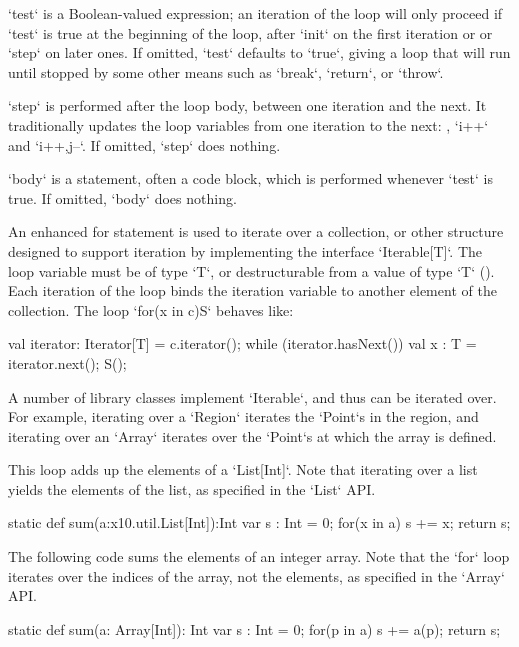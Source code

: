 \xcd`test` is a Boolean-valued expression; an iteration of the loop will only
proceed if \xcd`test` is true at the beginning of the loop, after \xcd`init`
on the first iteration or or \xcd`step` on later ones. If omitted, \xcd`test`
defaults to \xcd`true`, giving a loop that will run until stopped by some
other means such as \xcd`break`, \xcd`return`, or \xcd`throw`.

\xcd`step` is performed after the loop body, between one iteration and the
next. It traditionally updates the loop variables from one iteration to the
next: \eg, \xcd`i++` and \xcd`i++,j--`.  If omitted, \xcd`step` does nothing.

\xcd`body` is a statement, often a code block, which is performed whenever
\xcd`test` is true.  If omitted, \xcd`body` does nothing.




\label{ForAllLoop}


An enhanced for statement is used to iterate over a collection, or other
structure designed to support iteration by implementing the interface
\xcd`Iterable[T]`.    The loop variable must be of type \xcd`T`, 
or destructurable from a value of type \xcd`T`
().  
Each iteration of the loop
binds the iteration variable to another element of the collection.
The loop \xcd`for(x in c)S` behaves like: 
\begin{xten}
val iterator: Iterator[T] = c.iterator();
while (iterator.hasNext()) {
  val x : T = iterator.next();
  S();
}
\end{xten}

A number of library classes implement \xcd`Iterable`, and thus can be iterated
over.  For example, iterating over a \xcd`Region` iterates the \xcd`Point`s in
the region, and iterating over an \xcd`Array` iterates over the
\xcd`Point`s at which the  array is defined.

\begin{ex}
This loop adds up the elements of a \xcd`List[Int]`.
Note that iterating over a list yields the elements of the list, as specified
in the \xcd`List` API. 
\begin{xten}
static def sum(a:x10.util.List[Int]):Int {
  var s : Int = 0;
  for(x in a) s += x;
  return s;
}
\end{xten}

The following code sums the elements of an integer array.  Note that the
\xcd`for` loop iterates over the indices of the array, not the elements, as
specified in the \xcd`Array` API.  
\begin{xten}
static def sum(a: Array[Int]): Int {
  var s : Int = 0;
  for(p in a) s += a(p);
  return s;
}
\end{xten}



\end{ex}

